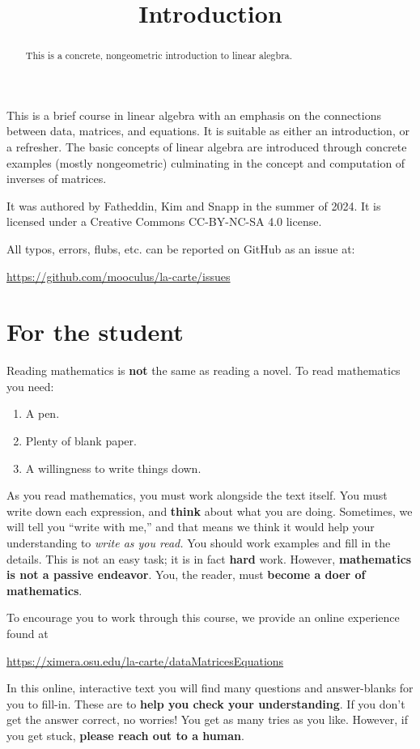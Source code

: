 \documentclass{ximera}
\title{Introduction}
\begin{document}
\begin{abstract}
  This is a concrete, nongeometric introduction to linear alegbra.
\end{abstract}
\maketitle

This is a brief course in linear algebra with an emphasis on the
connections between data, matrices, and equations. It is suitable as
either an introduction, or a refresher. The basic concepts of linear
algebra are introduced through concrete examples (mostly nongeometric)
culminating in the concept and computation of inverses of matrices.


It was authored by Fatheddin, Kim and Snapp in the summer of 2024. It
is licensed under a Creative Commons CC-BY-NC-SA 4.0 license.



All typos, errors, flubs, etc. can be reported on GitHub as an issue at:
\begin{center}
\url{https://github.com/mooculus/la-carte/issues}
\end{center}


\section*{For the student}


Reading mathematics is \textbf{not} the same as reading a novel. To
read mathematics you need:
\begin{enumerate}
\item A pen.
\item Plenty of blank paper.
\item A willingness to write things down.
\end{enumerate}
As you read mathematics, you must work alongside the text itself. You
must write down each expression, and \textbf{think} about what you are
doing. Sometimes, we will tell you ``write with me,'' and that means
we think it would help your understanding to \textit{write as you
  read.}  You should work examples and fill in the details. This is
not an easy task; it is in fact \textbf{hard} work. However,
\textbf{mathematics is not a passive endeavor}. You, the reader, must \textbf{become a
  doer of mathematics}.


To encourage you to work through this course, we provide an online experience found at
\begin{center}
  \url{https://ximera.osu.edu/la-carte/dataMatricesEquations}
\end{center}

In this online, interactive text you will find many questions and
answer-blanks for you to fill-in. These are to \textbf{help you check
  your understanding}. If you don't get the answer correct, no
worries! You get as many tries as you like. However, if you get stuck,
\textbf{please reach out to a human}.
\end{document}

